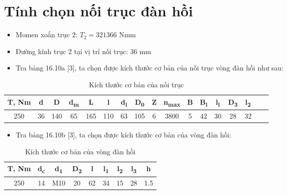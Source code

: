 \section{Tính chọn nối trục đàn hồi}
\begin{itemize}
    \item Momen xoắn trục 2: $T_2 = 321366$ Nmm
    \item Đường kính trục 2 tại vị trí nối trục: 36 mm
    \item Tra bảng 16.10a [3], ta chọn được kích thước cơ bản của nối trục vòng đàn hồi như sau:
\end{itemize}
\begin{table}[H]
    \centering
    \begin{tabular}{|c|c|c|c|c|c|c|c|c|c|c|c|c|c|c|c|c|}
    \hline
    \textbf{T, Nm} & \textbf{d} & \textbf{D} & \textbf{d\textsubscript{m}} & \textbf{L} & \textbf{l} & \textbf{d\textsubscript{l}} & \textbf{D\textsubscript{0}} & \textbf{Z} & \textbf{n\textsubscript{max}} & \textbf{B} & \textbf{B\textsubscript{l}} & \textbf{l\textsubscript{l}} & \textbf{D\textsubscript{3}} & \textbf{l\textsubscript{2}} \\
    \hline
    250 & 36 & 140 & 65 & 165 & 110 & 63 & 105 & 6 & 3800 & 5 & 42 & 30 & 28 & 32 \\
    \hline
    \end{tabular}
    \caption{Kích thước cơ bản của nối trục}
\end{table}
\begin{itemize}
    \item Tra bảng 16.10b [3], ta chọn được kích thước cơ bản của vòng đàn hồi:
\end{itemize}
\begin{table}[h]
    \centering
    \begin{tabular}{|c|c|c|c|c|c|c|c|c|}
    \hline
    \textbf{T, Nm} & \textbf{d\textsubscript{c}} & \textbf{d\textsubscript{1}} & \textbf{D\textsubscript{2}} & \textbf{l} & \textbf{l\textsubscript{1}} & \textbf{l\textsubscript{2}} & \textbf{l\textsubscript{3}} & \textbf{h} \\
    \hline
    250 & 14 & M10 & 20 & 62 & 34 & 15 & 28 & 1.5 \\
    \hline
    \end{tabular}
    \caption{Kích thước cơ bản của vòng đàn hồi}
\end{table}
